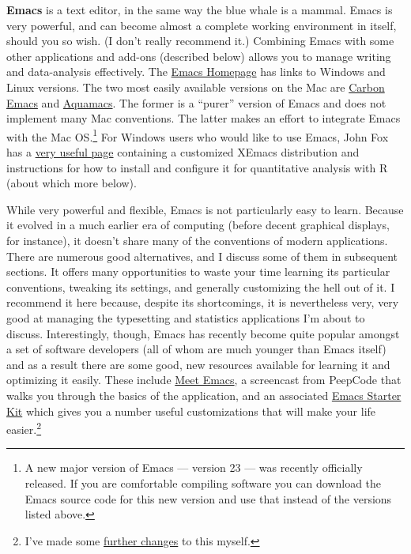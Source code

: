 \documentclass[11pt,article,oneside]{memoir}
\begin{document}
\textbf{Emacs} is a text editor, in the same way the blue whale is a mammal. Emacs is very powerful, and can become almost a complete working environment in itself, should you so wish. (I don't really recommend it.) Combining Emacs with some other applications and add-ons (described below) allows you to manage writing and data-analysis effectively. The \href{http://www.gnu.org/software/emacs/}{Emacs Homepage} has links to Windows and Linux versions. The two most easily available versions on the Mac are \href{http://www.apple.com/downloads/macosx/unix_open_source/carbonemacspackage.html}{Carbon Emacs} and \href{http://aquamacs.org/}{Aquamacs}. The former is a ``purer'' version of Emacs and does not implement many Mac conventions. The latter makes an effort to integrate Emacs with the Mac OS.\footnote{A new major version of Emacs --- version 23 --- was recently officially released. If you are comfortable compiling software you can download the Emacs source code for this new version and use that instead of the versions listed above.} For Windows users who would like to use Emacs, John Fox has a \href{http://socserv.mcmaster.ca/jfox/Books/Companion/ESS/}{very useful page} containing a customized XEmacs distribution and instructions for how to install and configure it for quantitative analysis with R (about which more below).

While very powerful and flexible, Emacs is not particularly easy to learn. Because it evolved in a much earlier era of computing (before decent graphical displays, for instance), it doesn't share many of the conventions of modern applications. There are numerous good alternatives, and I discuss some of them in subsequent sections. It offers many opportunities to waste your time learning its particular conventions, tweaking its settings, and generally customizing the hell out of it. I  recommend it here because, despite its shortcomings, it is nevertheless very, very good at managing the typesetting and statistics applications I'm about to discuss. Interestingly, though, Emacs has recently become quite popular amongst a set of software developers (all of whom are much younger than Emacs itself) and as a result there are some good, new resources available for learning it and optimizing it easily. These include \href{http://peepcode.com/products/meet-emacs}{Meet Emacs}, a screencast from PeepCode that walks you through the basics of the application, and an associated \href{http://github.com/technomancy/emacs-starter-kit/tree/master}{Emacs Starter Kit} which gives you a number useful customizations that will make your life easier.\footnote{I've made some \href{http://kjhealy.github.com/emacs-starter-kit/}{further changes} to this myself.}
\end{document}

